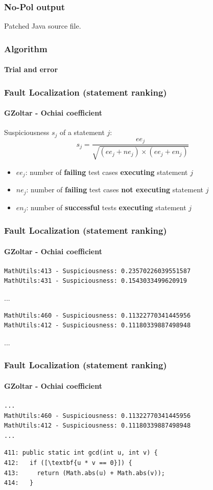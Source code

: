 \documentclass{beamer}
\begin{document}
\begin{frame}
\frametitle{No-Pol output}
Patched Java source file.
\end{frame}


\frame
{
    \frametitle{Algorithm}
    \framesubtitle{Trial and error}
  \begin{center}
  
  \end{center}
}


 \begin{frame}[fragile]
    \frametitle{Fault Localization (statement ranking)}
      \framesubtitle{GZoltar - Ochiai coefficient}
Suspiciousness $s_j$ of a statement $j$:
\begin{equation*}
 s_j=\dfrac{ee_j}{\sqrt{(ee_j + ne_j ) \times (ee_j + en_j )}}
\end{equation*}
\begin{itemize}
 \item $ee_j$: number of \textbf{failing} test cases \textbf{executing} statement $j$ 
 \item $ne_j$: number of \textbf{failing} test cases \textbf{not executing} statement $j$
 \item $en_j$: number of \textbf{successful} tests \textbf{executing} statement $j$
\end{itemize}
\end{frame}


\begin{frame}[fragile]
\frametitle{Fault Localization (statement ranking)}
\framesubtitle{GZoltar - Ochiai coefficient}
\begin{verbatim}
MathUtils:413 - Suspiciousness: 0.23570226039551587
MathUtils:431 - Suspiciousness: 0.1543033499620919
\end{verbatim}
...
\begin{verbatim}
MathUtils:460 - Suspiciousness: 0.11322770341445956
MathUtils:412 - Suspiciousness: 0.11180339887498948
\end{verbatim}
...
\end{frame}

\begin{frame}[fragile]
\frametitle{Fault Localization (statement ranking)}
\framesubtitle{GZoltar - Ochiai coefficient}
\begin{verbatim}
...
MathUtils:460 - Suspiciousness: 0.11322770341445956
MathUtils:412 - Suspiciousness: 0.11180339887498948
...
\end{verbatim}

\begin{lstlisting}[escapeinside=\[\]]
411: public static int gcd(int u, int v) {
412:   if ([\textbf{u * v == 0}]) {
413:     return (Math.abs(u) + Math.abs(v));
414:   }
\end{lstlisting}
\end{frame}
\end{document}
